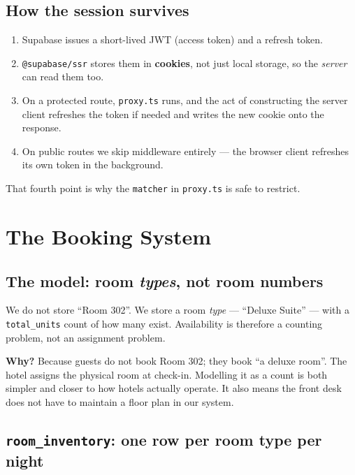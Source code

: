 \documentclass[11pt,a4paper]{article}
\newcommand{\file}[1]{\texttt{\small #1}}
\begin{document}
\subsection{How the session survives}

\begin{enumerate}[leftmargin=*,noitemsep]
  \item Supabase issues a short-lived JWT (access token) and a refresh token.
  \item \texttt{@supabase/ssr} stores them in \textbf{cookies}, not just local
        storage, so the \emph{server} can read them too.
  \item On a protected route, \file{proxy.ts} runs, and the act of constructing
        the server client refreshes the token if needed and writes the new cookie
        onto the response.
  \item On public routes we skip middleware entirely --- the browser client
        refreshes its own token in the background.
\end{enumerate}

That fourth point is why the \texttt{matcher} in \file{proxy.ts} is safe to
restrict.

\newpage
\section{The Booking System}

\subsection{The model: room \emph{types}, not room numbers}

We do not store ``Room 302''. We store a room \emph{type} --- ``Deluxe Suite'' ---
with a \texttt{total\_units} count of how many exist. Availability is therefore a
counting problem, not an assignment problem.

\begin{notebox}
\textbf{Why?} Because guests do not book Room 302; they book ``a deluxe room''.
The hotel assigns the physical room at check-in. Modelling it as a count is both
simpler and closer to how hotels actually operate. It also means the front desk
does not have to maintain a floor plan in our system.
\end{notebox}

\subsection{\texttt{room\_inventory}: one row per room type per night}
\end{document}
